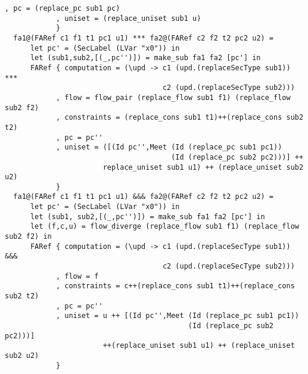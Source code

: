 \begin{Verbatim}[fontsize=\footnotesize,frame=lines,
                 framesep=5mm, label={[FlowArrowRef.hs]FlowArrowRef.hs}]
            , pc = (replace_pc sub1 pc) 
            , uniset = (replace_uniset sub1 u)
            }
  fa1@(FARef c1 f1 t1 pc1 u1) *** fa2@(FARef c2 f2 t2 pc2 u2) =
      let pc' = (SecLabel (LVar "x0")) in
      let (sub1,sub2,[(_,pc'')]) = make_sub fa1 fa2 [pc'] in
      FARef { computation = (\upd -> c1 (upd.(replaceSecType sub1)) *** 
                                     c2 (upd.(replaceSecType sub2)))
            , flow = flow_pair (replace_flow sub1 f1) (replace_flow sub2 f2)
            , constraints = (replace_cons sub1 t1)++(replace_cons sub2 t2)
            , pc = pc''
            , uniset = ([(Id pc'',Meet (Id (replace_pc sub1 pc1)) 
                                       (Id (replace_pc sub2 pc2)))] ++
                       replace_uniset sub1 u1) ++ (replace_uniset sub2 u2)
            }
  fa1@(FARef c1 f1 t1 pc1 u1) &&& fa2@(FARef c2 f2 t2 pc2 u2) =
      let pc' = (SecLabel (LVar "x0")) in
      let (sub1, sub2,[(_,pc'')]) = make_sub fa1 fa2 [pc'] in
      let (f,c,u) = flow_diverge (replace_flow sub1 f1) (replace_flow sub2 f2) in
      FARef { computation = (\upd -> c1 (upd.(replaceSecType sub1)) &&& 
                                     c2 (upd.(replaceSecType sub2)))
            , flow = f
            , constraints = c++(replace_cons sub1 t1)++(replace_cons sub2 t2)
            , pc = pc''
            , uniset = u ++ [(Id pc'',Meet (Id (replace_pc sub1 pc1)) 
                                           (Id (replace_pc sub2 pc2)))]
                       ++(replace_uniset sub1 u1) ++ (replace_uniset sub2 u2)
            }


\end{Verbatim}
